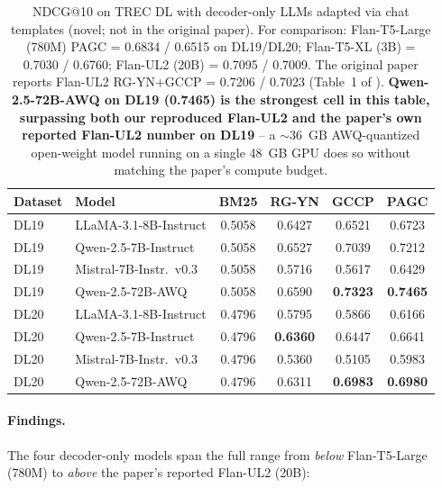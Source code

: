 \documentclass[sigconf]{acmart}
\begin{document}
\begin{table}[t]
\centering
\small
\begin{tabular}{llcccc}
\toprule
\textbf{Dataset} & \textbf{Model} & \textbf{BM25} & \textbf{RG-YN} & \textbf{GCCP} & \textbf{PAGC} \\
\midrule
DL19 & LLaMA-3.1-8B-Instruct    & 0.5058 & 0.6427 & 0.6521 & 0.6723 \\
DL19 & Qwen-2.5-7B-Instruct     & 0.5058 & 0.6527 & 0.7039 & 0.7212 \\
DL19 & Mistral-7B-Instr.\ v0.3  & 0.5058 & 0.5716 & 0.5617 & 0.6429 \\
DL19 & Qwen-2.5-72B-AWQ         & 0.5058 & 0.6590 & \textbf{0.7323} & \textbf{0.7465} \\
\midrule
DL20 & LLaMA-3.1-8B-Instruct    & 0.4796 & 0.5795 & 0.5866 & 0.6166 \\
DL20 & Qwen-2.5-7B-Instruct     & 0.4796 & \textbf{0.6360} & 0.6447 & 0.6641 \\
DL20 & Mistral-7B-Instr.\ v0.3  & 0.4796 & 0.5360 & 0.5105 & 0.5983 \\
DL20 & Qwen-2.5-72B-AWQ         & 0.4796 & 0.6311 & \textbf{0.6983} & \textbf{0.6980} \\
\bottomrule
\end{tabular}
\caption{NDCG@10 on TREC DL with decoder-only LLMs adapted via chat
templates (novel; not in the original paper). For comparison: Flan-T5-Large
(780M) PAGC = 0.6834 / 0.6515 on DL19/DL20; Flan-T5-XL (3B) = 0.7030 /
0.6760; Flan-UL2 (20B) = 0.7095 / 0.7009. The original paper reports
Flan-UL2 RG-YN+GCCP = 0.7206 / 0.7023 (Table~1 of \cite{long2025precise}).
\textbf{Qwen-2.5-72B-AWQ on DL19 (0.7465) is the strongest cell in
this table, surpassing both our reproduced Flan-UL2 and the paper's
own reported Flan-UL2 number on DL19} -- a $\sim$36~GB AWQ-quantized
open-weight model running on a single 48~GB GPU does so without
matching the paper's compute budget.}
\label{tab:decoder}
\end{table}

\paragraph{Findings.} The four decoder-only models span the full
range from \emph{below} Flan-T5-Large (780M) to \emph{above} the
paper's reported Flan-UL2 (20B):
\end{document}
